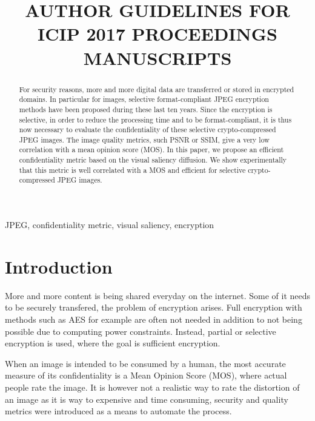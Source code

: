 \documentclass{article}
\title{AUTHOR GUIDELINES FOR ICIP 2017 PROCEEDINGS MANUSCRIPTS}
\begin{document}
%
\maketitle
%
\begin{abstract}
For security reasons, more and more digital data are transferred or stored in encrypted domains.  In particular for images, selective format-compliant JPEG encryption methods have been proposed during these last ten years. Since the encryption is selective, in order to reduce the processing time and to be format-compliant, it is thus now necessary to evaluate the confidentiality of these selective crypto-compressed JPEG images. The image quality metrics, such PSNR or SSIM, give a very low correlation with a mean opinion score (MOS). In this paper, we propose an efficient confidentiality metric based on the visual saliency diffusion. We show experimentally that this metric is well correlated with a MOS and efficient for selective crypto-compressed JPEG images.
\end{abstract}
%
\begin{keywords}
JPEG, confidentiality metric, visual saliency, encryption
\end{keywords}
%
\section{Introduction}
\label{sec:intro}
More and more content is being shared everyday on the internet. Some of it needs to be securely transfered, the problem of encryption arises. Full encryption with methods such as AES for example are often not needed in addition to not being possible due to computing power constraints. Instead, partial or selective encryption is used, where the goal is sufficient encryption. %

When an image is intended to be consumed by a human, the most accurate measure of its confidentiality is a Mean Opinion Score (MOS), where actual people rate the image. It is however not a realistic way to rate the distortion of an image as it is way to expensive and time consuming, security and quality metrics were introduced as a means to automate the process.
\end{document}
